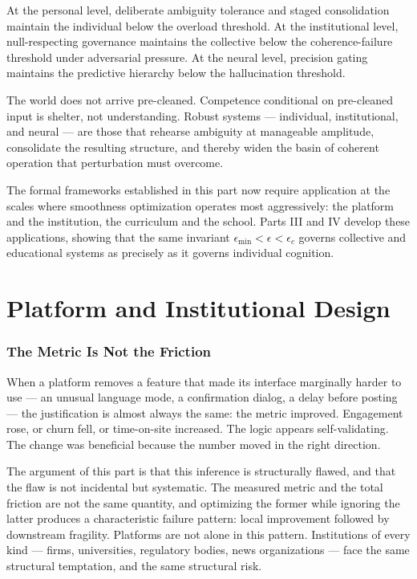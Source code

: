\documentclass[11pt]{article}
\theoremstyle{remark}
\begin{document}
At the personal level, deliberate ambiguity tolerance and staged consolidation maintain the individual below the overload threshold. At the institutional level, null-respecting governance maintains the collective below the coherence-failure threshold under adversarial pressure. At the neural level, precision gating maintains the predictive hierarchy below the hallucination threshold.

The world does not arrive pre-cleaned. Competence conditional on pre-cleaned input is shelter, not understanding. Robust systems --- individual, institutional, and neural --- are those that rehearse ambiguity at manageable amplitude, consolidate the resulting structure, and thereby widen the basin of coherent operation that perturbation must overcome.

The formal frameworks established in this part now require application at the scales where smoothness optimization operates most aggressively: the platform and the institution, the curriculum and the school. Parts III and IV develop these applications, showing that the same invariant $\epsilon_{\min} < \epsilon < \epsilon_c$ governs collective and educational systems as precisely as it governs individual cognition.


\part{Platform and Institutional Design}
\label{part:platform}

\section{The Metric Is Not the Friction}
\label{sec:metric_friction}

When a platform removes a feature that made its interface marginally harder to use --- an unusual language mode, a confirmation dialog, a delay before posting --- the justification is almost always the same: the metric improved. Engagement rose, or churn fell, or time-on-site increased. The logic appears self-validating. The change was beneficial because the number moved in the right direction.

The argument of this part is that this inference is structurally flawed, and that the flaw is not incidental but systematic. The measured metric and the total friction are not the same quantity, and optimizing the former while ignoring the latter produces a characteristic failure pattern: local improvement followed by downstream fragility. Platforms are not alone in this pattern. Institutions of every kind --- firms, universities, regulatory bodies, news organizations --- face the same structural temptation, and the same structural risk.
\end{document}

